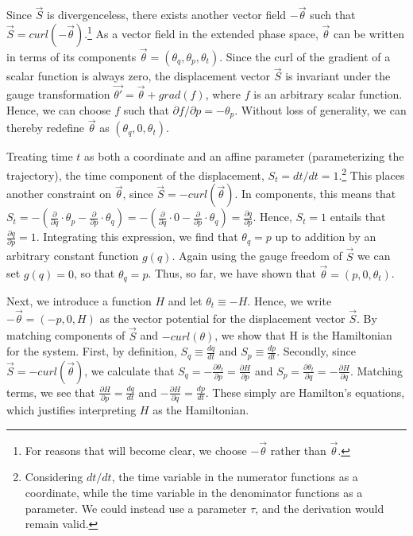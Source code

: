 \documentclass[letterpaper]{article}
\renewcommand{\vector}[1]{\ensuremath{\vec{#1}}} %
\begin{document}
Since $\vector{S}$ is divergenceless, there exists another vector field $-\vector{\theta}$ such that $\vector{S} = curl(-\vector{\theta} )$.\footnote{For reasons that will become clear, we choose $-\vector{\theta}$ rather than $\vector{\theta}$.} As a vector field in the extended phase space, $\vector{\theta}$ can be written in terms of its components $\vector{\theta} = (\theta_q, \theta_p, \theta_t) $. Since the curl of the gradient of a scalar function is always zero, the displacement vector $\vector{S}$ is invariant under the gauge transformation $\vector{\theta'} =\vector{\theta} + grad(f)$, where $f$ is an arbitrary scalar function. Hence, we can choose $f$ such that $\partial f/ \partial p = -\theta_p $. Without loss of generality, we can thereby redefine $\vector{\theta}$ as $(\theta_q, 0, \theta_t) $.

Treating time $t$ as both a coordinate and an affine parameter (parameterizing the trajectory), the time component of the displacement, $S_t = dt/ dt = 1$.\footnote{Considering $dt/dt$, the time variable in the numerator functions as a coordinate, while the time variable in the denominator functions as a parameter. We could instead use a parameter $\tau$, and the derivation would remain valid.} This places another constraint on $\vector{\theta} $, since $\vector{S} = -curl(\vector{\theta}) $. In components, this means that $S_t = - (\frac{\partial}{\partial q} \cdot \theta_p - \frac{\partial}{\partial p} \cdot \theta_q) = - (\frac{\partial}{\partial q} \cdot 0 - \frac{\partial}{\partial p} \cdot \theta_q) = \frac{\partial q}{\partial p}$. Hence, $S_t = 1$ entails that $\frac{\partial q}{\partial p} = 1$. Integrating this expression, we find that $\theta_q = p$ up to addition by an arbitrary constant function $g(q)$. Again using the gauge freedom of $\vector{S}$ we can set $g(q)=0$, so that $\theta_q = p$. Thus, so far, we have shown that $\vector{\theta} = (p, 0,\theta_t) $.

Next, we introduce a function $H$ and let $ \theta_t \equiv -H$. Hence, we write $-\vector{\theta} = (-p, 0, H) $ as the vector potential for the displacement vector $\vector{S} $. By matching components of $\vector{S}$ and $-curl(\theta)$, we show that H is the Hamiltonian for the system. First, by definition, $S_q \equiv \frac{dq}{dt} $ and $S_p \equiv  \frac{dp}{dt} $. Secondly, since $\vector{S} = -curl(\vector{\theta}) $, we calculate that $S_q = -\frac{\partial \theta_t}{\partial p} = \frac{\partial H}{\partial p}$ and $S_p = \frac{\partial \theta_t}{\partial q}=-\frac{\partial H}{\partial q}$. Matching terms, we see that $\frac{\partial H}{\partial p} =\frac{dq}{dt} $ and $-\frac{\partial H}{\partial q} =\frac{dp}{dt}$. These simply are Hamilton's equations, which justifies interpreting $H$ as the Hamiltonian.
\end{document}
